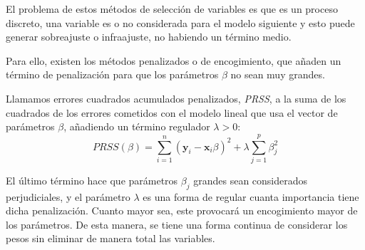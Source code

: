 \noindent El problema de estos métodos de selección de variables es que es un proceso discreto, una variable es o no considerada para el modelo siguiente y esto puede generar sobreajuste o infraajuste, no habiendo un término medio. 

\noindent Para ello, existen los métodos penalizados o de encogimiento, que añaden un término de penalización para que los parámetros $\beta$ no sean muy grandes.

\begin{defi} 
Llamamos errores cuadrados acumulados penalizados, \emph{PRSS}, a la suma de los cuadrados de los errores cometidos con el modelo lineal que usa el  vector de parámetros $\beta$, añadiendo un término regulador $\lambda >0$: 
\begin{equation}
PRSS(\beta)=\sum_{i=1}^n(\textbf{y}_i-\textbf{x}_i\beta)^2+\lambda\sum_{j=1}^p\beta_j^2
\end{equation}
\end{defi}
\noindent El último término hace que parámetros $\beta_j$ grandes sean considerados perjudiciales, y el parámetro $\lambda$ es una forma de regular cuanta importancia tiene dicha penalización. Cuanto mayor sea, este provocará un encogimiento mayor de los parámetros. 
De esta manera, se tiene una forma continua de considerar los pesos sin eliminar de manera total las variables.














